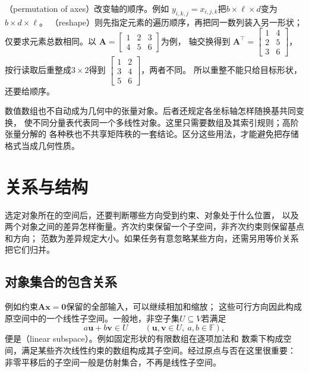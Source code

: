 （permutation of axes）改变轴的顺序。例如
$y_{i,k,j}=x_{i,j,k}$把$b\times\ell\times d$变为$b\times d\times\ell$。
（reshape）则先指定元素的遍历顺序，再把同一数列装入另一形状；
仅要求元素总数相同。以
$\bm A=\left[\begin{smallmatrix}1&2&3\\4&5&6\end{smallmatrix}\right]$为例，
轴交换得到
$\bm A^\top=\left[\begin{smallmatrix}1&4\\2&5\\3&6\end{smallmatrix}\right]$，
按行读取后重整成$3\times2$得到
$\left[\begin{smallmatrix}1&2\\3&4\\5&6\end{smallmatrix}\right]$，两者不同。
所以重整不能只给目标形状，还要给顺序。


数值数组也不自动成为几何中的张量对象。后者还规定各坐标轴怎样随换基共同变换，
使不同分量表代表同一个多线性对象。这里只需要数组及其索引规则；高阶张量分解的
各种秩也不共享矩阵秩的一套结论。区分这些用法，才能避免把存储格式当成几何性质。

\section{关系与结构}
\label{sec:linear-algebra-relations}

选定对象所在的空间后，还要判断哪些方向受到约束、对象处于什么位置，
以及两个对象之间的差异怎样衡量。齐次约束保留一个子空间，非齐次约束则保留基点和方向；
范数为差异规定大小。如果任务有意忽略某些方向，还需另用等价关系把它们归并。

\subsection{对象集合的包含关系}
\label{sec:linear-algebra-subspace-relations}

例如约束$\bm A\bm x=\bm0$保留的全部输入，可以继续相加和缩放；
这些可行方向因此构成原空间中的一个线性子空间。一般地，非空子集$U\subseteq V$若满足
\[
 a\bm u+b\bm v\in U
 \qquad(\bm u,\bm v\in U,\ a,b\in\mathbb F),
\]
便是（linear subspace）。例如固定形状的有限数组在逐项加法和
数乘下构成空间，满足某些齐次线性约束的数组构成其子空间。经过原点与否在这里很重要：
非零平移后的子空间一般是仿射集合，不再是线性子空间。



